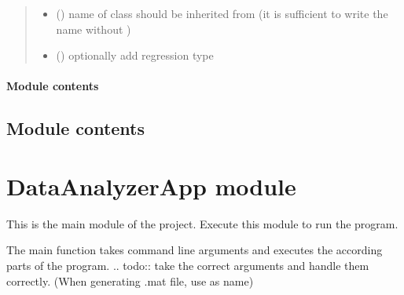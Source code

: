 \documentclass[letterpaper,10pt,english]{sphinxmanual}
\begin{document}
\begin{fulllineitems}
\begin{quote}
\begin{description}
\begin{itemize}
\item {} 
 () \textendash{} name of class  should be inherited from
(it is sufficient to write the name without )

\item {} 
 () \textendash{} optionally add regression type

\end{itemize}

\end{description}\end{quote}

\end{fulllineitems}



\paragraph{Module contents}
\label{\detokenize{DataAnalyzer.PlotConfig:module-DataAnalyzer.PlotConfig}}\label{\detokenize{DataAnalyzer.PlotConfig:module-contents}}

\subsection{Module contents}
\label{\detokenize{DataAnalyzer:module-DataAnalyzer}}\label{\detokenize{DataAnalyzer:module-contents}}

\section{DataAnalyzerApp module}
\label{\detokenize{DataAnalyzerApp:module-DataAnalyzerApp}}\label{\detokenize{DataAnalyzerApp:dataanalyzerapp-module}}\label{\detokenize{DataAnalyzerApp::doc}}
This is the main module of the project. Execute this module to run the program.

\begin{fulllineitems}
\label{\detokenize{DataAnalyzerApp:DataAnalyzerApp.main}}
The main function takes command line arguments and executes the according parts of the program.
.. todo:: take the correct arguments and handle them correctly. (When generating .mat file, use  as name)

\end{fulllineitems}
\end{document}
